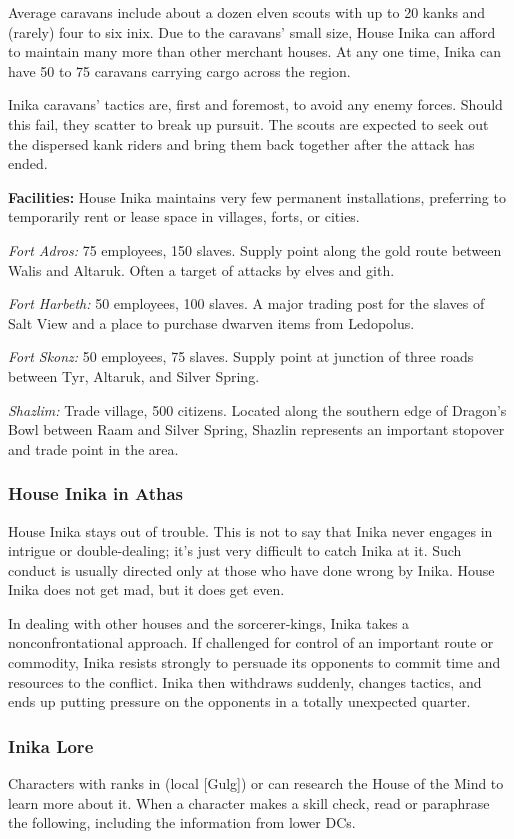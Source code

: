 Average caravans include about a dozen elven scouts with up to 20 kanks and (rarely) four to six inix. Due to the caravans' small size, House Inika can afford to maintain many more than other merchant houses. At any one time, Inika can have 50 to 75 caravans carrying cargo across the region.

Inika caravans' tactics are, first and foremost, to avoid any enemy forces. Should this fail, they scatter to break up pursuit. The scouts are expected to seek out the dispersed kank riders and bring them back together after the attack has ended.

\textbf{Facilities:} House Inika maintains very few permanent installations, preferring to temporarily rent or lease space in villages, forts, or cities.

\textit{Fort Adros:} 75 employees, 150 slaves. Supply point along the gold route between Walis and Altaruk. Often a target of attacks by elves and gith.

\textit{Fort Harbeth:} 50 employees, 100 slaves. A major trading post for the slaves of Salt View and a place to purchase dwarven items from Ledopolus.

\textit{Fort Skonz:} 50 employees, 75 slaves. Supply point at junction of three roads between Tyr, Altaruk, and Silver Spring.

\textit{Shazlim:} Trade village, 500 citizens. Located along the southern edge of Dragon's Bowl between Raam and Silver Spring, Shazlin represents an important stopover and trade point in the area.

\subsubsection{House Inika in Athas}
House Inika stays out of trouble. This is not to say that Inika never engages in intrigue or double-dealing; it's just very difficult to catch Inika at it. Such conduct is usually directed only at those who have done wrong by Inika. House Inika does not get mad, but it does get even.

In dealing with other houses and the sorcerer-kings, Inika takes a nonconfrontational approach. If challenged for control of an important route or commodity, Inika resists strongly to persuade its opponents to commit time and resources to the conflict. Inika then withdraws suddenly, changes tactics, and ends up putting pressure on the opponents in a totally unexpected quarter.

\subsubsection{Inika Lore}
Characters with ranks in  (local [Gulg]) or  can research the House of the Mind to learn more about it. When a character makes a skill check, read or paraphrase the following, including the information from lower DCs.

